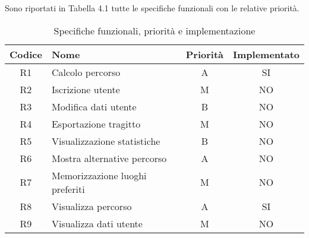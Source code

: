Sono riportati in Tabella 4.1 tutte le specifiche funzionali con le relative priorità.

\begin{table}[h]
\centering
\begin{tabular}{|c|l|c|c|}
\hline
Codice & Nome                            & Priorità & Implementato \\ \hline
R1     & Calcolo percorso                & A        & SI           \\ \hline
R2     & Iscrizione utente               & M        & NO           \\ \hline
R3     & Modifica dati utente            & B        & NO           \\ \hline
R4     & Esportazione tragitto           & M        & NO           \\ \hline
R5     & Visualizzazione statistiche     & B        & NO           \\ \hline
R6     & Mostra alternative percorso     & A        & NO           \\ \hline
R7     & Memorizzazione luoghi preferiti & M        & NO           \\ \hline
R8     & Visualizza percorso             & A        & SI           \\ \hline
R9     & Visualizza dati utente          & M        & NO           \\ \hline
\end{tabular}
\caption{Specifiche funzionali, priorità e implementazione}
\end{table}